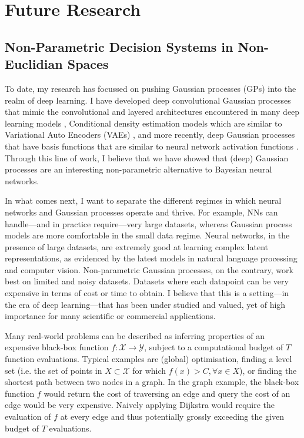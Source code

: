 \chapter{Future Research}
\label{chapter:future-research}

\section{Non-Parametric Decision Systems in Non-Euclidian Spaces}

To date, my research has focussed on pushing Gaussian processes (GPs) into the realm of deep learning. I have developed deep convolutional Gaussian processes that mimic the convolutional and layered architectures encountered in many deep learning models \citep{Dutordoir2020convolutional}, Conditional density estimation models which are similar to Variational Auto Encoders (VAEs) \citep{dutordoir2018cde}, and more recently, deep Gaussian processes that have basis functions that are similar to neural network activation functions \citep{dutordoir2021deep}. Through this line of work, I believe that we have showed that (deep) Gaussian processes are an interesting non-parametric alternative to Bayesian neural networks.

In what comes next, I want to separate the different regimes in which neural networks and Gaussian processes operate and thrive. For example, NNs can handle---and in practice require---very large datasets, whereas Gaussian process models are more comfortable in the small data regime. Neural networks, in the presence of large datasets, are extremely good at learning complex latent representations, as evidenced by the latest models in natural language processing and computer vision. Non-parametric Gaussian processes, on the contrary, work best on limited and noisy datasets. Datasets where each datapoint can be very expensive in terms of cost or time to obtain. I believe that this is a setting---in the era of deep learning---that has been under studied and valued, yet of high importance for many scientific or commercial applications.

Many real-world problems can be described as inferring properties of an expensive black-box function $f: \mathcal{X} \rightarrow \mathcal{Y}$, subject to a computational budget of $T$ function evaluations. Typical examples are (global) optimisation, finding a level set (i.e. the set of points in $X \subset \mathcal{X}$ for which $f(x) > C,\forall x \in X$), or finding the shortest path between two nodes in a graph. In the graph example, the black-box function $f$ would return the cost of traversing an edge and query the cost of an edge would be very expensive. Naively applying Dijkstra would require the evaluation of $f$ at every edge and thus potentially grossly exceeding the given budget of $T$ evaluations.


